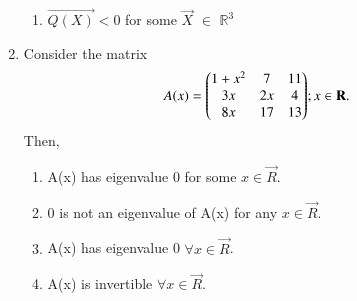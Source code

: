 \begin{enumerate}[label=\thesection.\arabic*.,ref=\thesection.\theenumi]
\begin{enumerate}
	\item $\vec{Q(X)} < 0 $ for some $\vec{X}$ $\in$ $\mathbb{R}^3$
\end{enumerate}
%
%
\solution

\item Consider the matrix
\begin{align}
A(x) = \begin{pmatrix}1+x^2&7&11\\3x&2x&4\\8x&17&13\end{pmatrix} & ;x\in \mathbf{R}.
\end{align}
Then,
\begin{enumerate}
\item A(x) has eigenvalue 0 for some $x\in \vec{R}$.
\item 0 is not an eigenvalue of A(x) for any $x\in \vec{R}$.
\item A(x) has eigenvalue 0 $\forall x\in \vec{R}$.
\item A(x) is invertible $\forall x\in \vec{R}$.
\end{enumerate}
%
\solution

\end{enumerate}
